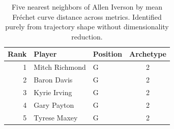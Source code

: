 \begin{table}[htbp]
  \centering\small
  \begin{tabular}{rllc}
    \toprule
    Rank & Player & Position & Archetype \\
    \midrule
    1 & Mitch Richmond & G & 2 \\
    2 & Baron Davis & G & 2 \\
    3 & Kyrie Irving & G & 2 \\
    4 & Gary Payton & G & 2 \\
    5 & Tyrese Maxey & G & 2 \\
    \bottomrule
  \end{tabular}
  \caption{Five nearest neighbors of Allen Iverson by mean Fr\'{e}chet curve distance across metrics. Identified purely from trajectory shape without dimensionality reduction.}
  \label{tab:Allen_Iverson_frechet_curve_neighbors}
\end{table}

